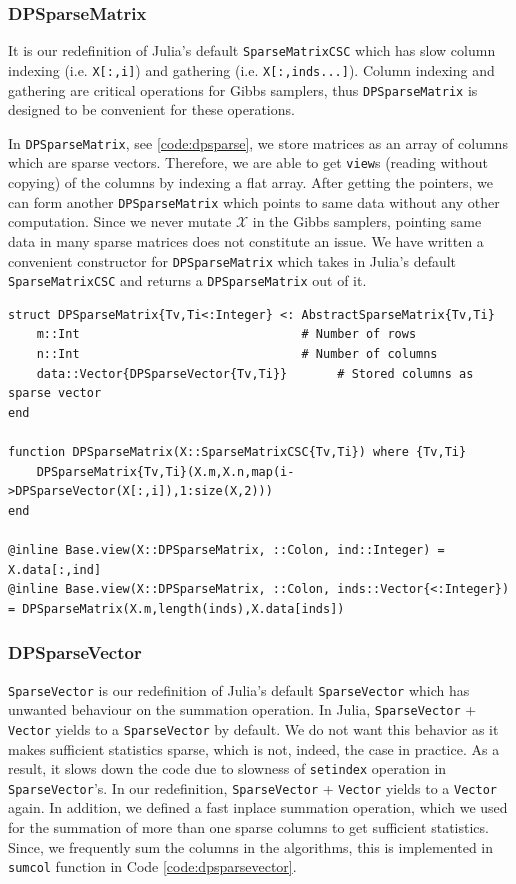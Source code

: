 \documentclass[12pt, a4paper]{article}
\newenvironment{code}{\captionsetup{type=listing}}{}
\begin{document}
\subsubsection{DPSparseMatrix} It is our redefinition of Julia's default \texttt{SparseMatrixCSC} which has slow column indexing (i.e. \texttt{X[:,i]}) and gathering (i.e. \texttt{X[:,inds...]}). Column indexing and gathering are critical operations for Gibbs samplers, thus  \texttt{DPSparseMatrix} is designed to be convenient for these operations. 

In \texttt{DPSparseMatrix}, see \ref{code:dpsparse}, we store matrices as an array of columns which are sparse vectors. Therefore, we are able to get \texttt{view}s (reading without copying) of the columns by indexing a flat array. After getting the pointers, we can form another \texttt{DPSparseMatrix} which points to same data without any other computation.  Since we never mutate $\mathcal{X}$ in the Gibbs samplers, pointing same data in many sparse matrices does not constitute an issue. We have written a convenient constructor for \texttt{DPSparseMatrix} which takes in Julia's default \texttt{SparseMatrixCSC} and returns a \texttt{DPSparseMatrix} out of it.

\begin{code}
\begin{verbatim}
struct DPSparseMatrix{Tv,Ti<:Integer} <: AbstractSparseMatrix{Tv,Ti}
    m::Int                               # Number of rows
    n::Int                               # Number of columns
    data::Vector{DPSparseVector{Tv,Ti}}       # Stored columns as sparse vector
end

function DPSparseMatrix(X::SparseMatrixCSC{Tv,Ti}) where {Tv,Ti}
    DPSparseMatrix{Tv,Ti}(X.m,X.n,map(i->DPSparseVector(X[:,i]),1:size(X,2)))
end

@inline Base.view(X::DPSparseMatrix, ::Colon, ind::Integer) = X.data[:,ind]
@inline Base.view(X::DPSparseMatrix, ::Colon, inds::Vector{<:Integer}) = DPSparseMatrix(X.m,length(inds),X.data[inds])
\end{verbatim}
\label{code:dpsparse}
\end{code}

\subsubsection{DPSparseVector} \texttt{SparseVector} is our redefinition of Julia's default  \texttt{SparseVector} which has unwanted behaviour on the summation operation. In Julia, \texttt{SparseVector} + \texttt{Vector} yields to a \texttt{SparseVector} by default. We do not want this behavior as it makes sufficient statistics sparse, which is not, indeed, the case in practice. As a result, it slows down the code due to slowness of \texttt{setindex} operation in \texttt{SparseVector}'s. In our redefinition, \texttt{SparseVector} + \texttt{Vector} yields to a \texttt{Vector} again. In addition, we defined a fast inplace summation operation, which we used for the summation of more than one sparse columns to get sufficient statistics. Since, we frequently sum the columns in the algorithms, this is implemented in \texttt{sumcol} function in Code  \ref{code:dpsparsevector}.
\end{document}
